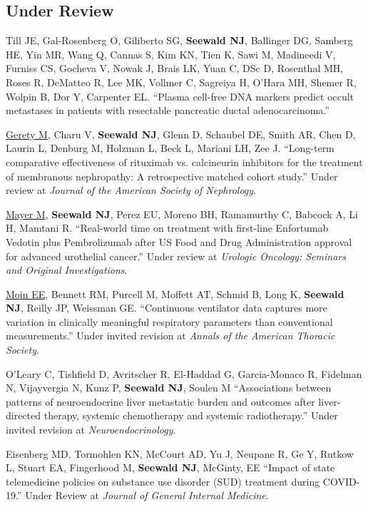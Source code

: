\documentclass[letterpaper,11pt]{article} %
\begin{document}
    \subsection*{Under Review}
        \begin{etaremune}
            \item Till JE, Gal-Rosenberg O, Giliberto SG, \textbf{Seewald NJ}, Ballinger DG, Samberg HE, Yin MR, Wang Q, Cannas S, Kim KN, Tien K, Sawi M, Madineedi V, Furniss CS, Gocheva V, Nowak J, Brais LK, Yuan C, DSc D, Rosenthal MH, Roses R, DeMatteo R, Lee MK, Vollmer C, Sagreiya H, O’Hara MH, Shemer R, Wolpin B, Dor Y, Carpenter EL. ``Plasma cell-free DNA markers predict occult metastases in patients with resectable pancreatic ductal adenocarcinoma.'' 
            
            \item \underline{Gerety M}, Charu V, \textbf{Seewald NJ}, Glenn D, Schaubel DE, Smith AR, Chen D, Laurin L, Denburg M, Holzman L, Beck L, Mariani LH, Zee J. ``Long-term comparative effectiveness of rituximab vs. calcineurin inhibitors for the treatment of membranous nephropathy: A retrospective matched cohort study.'' Under review at \textit{Journal of the American Society of Nephrology}.
        
            \item \underline{Mayer M}, \textbf{Seewald NJ}, Perez EU, Moreno BH, Ramamurthy C, Babcock A, Li H, Mamtani R. ``Real-world time on treatment with first-line Enfortumab Vedotin plus Pembrolizumab after US Food and Drug Administration approval for advanced urothelial cancer.'' Under review at \textit{Urologic Oncology: Seminars and Original Investigations}.
        
            \item \underline{Moin EE}, Bennett RM, Purcell M, Moffett AT, Schmid B, Long K, \textbf{Seewald NJ}, Reilly JP, Weissman GE. ``Continuous ventilator data captures more variation in clinically meaningful respiratory parameters than conventional measurements.'' Under invited revision at \textit{Annals of the American Thoracic Society}.
        
            \item O'Leary C, Tishfield D, Avritscher R, El-Haddad G, Garcia-Monaco R, Fidelman N, Vijayvergia N, Kunz P, \textbf{Seewald NJ}, Soulen M ``Associations between patterns of neuroendocrine liver metastatic burden and outcomes after liver-directed therapy, systemic chemotherapy and systemic radiotherapy.'' Under invited revision at \textit{Neuroendocrinology}.
            
            \item Eisenberg MD, Tormohlen KN, McCourt AD, Yu J, Neupane R, Ge Y, Rutkow L, Stuart EA, Fingerhood M, \textbf{Seewald NJ}, McGinty, EE ``Impact of state telemedicine policies on substance use disorder (SUD) treatment during COVID-19.'' Under Review at \textit{Journal of General Internal Medicine}.
            
	    \end{etaremune}
\end{document}
